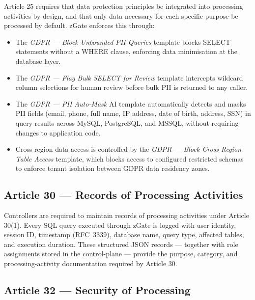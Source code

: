 Article 25 requires that data protection principles be integrated into processing activities by design, and that only data necessary for each specific purpose be processed by default. zGate enforces this through:
\begin{itemize}
    \item The \textit{GDPR --- Block Unbounded PII Queries} template blocks SELECT statements without a WHERE clause, enforcing data minimisation at the database layer.
    \item The \textit{GDPR --- Flag Bulk SELECT for Review} template intercepts wildcard column selections for human review before bulk PII is returned to any caller.
    \item The \textit{GDPR --- PII Auto-Mask} AI template automatically detects and masks PII fields (email, phone, full name, IP address, date of birth, address, SSN) in query results across MySQL, PostgreSQL, and MSSQL, without requiring changes to application code.
    \item Cross-region data access is controlled by the \textit{GDPR --- Block Cross-Region Table Access} template, which blocks access to configured restricted schemas to enforce tenant isolation between GDPR data residency zones.
\end{itemize}

\subsection{Article 30 --- Records of Processing Activities}

Controllers are required to maintain records of processing activities under Article 30(1). Every SQL query executed through zGate is logged with user identity, session ID, timestamp (RFC~3339), database name, query type, affected tables, and execution duration. These structured JSON records --- together with role assignments stored in the control-plane --- provide the purpose, category, and processing-activity documentation required by Article 30.

\subsection{Article 32 --- Security of Processing}

